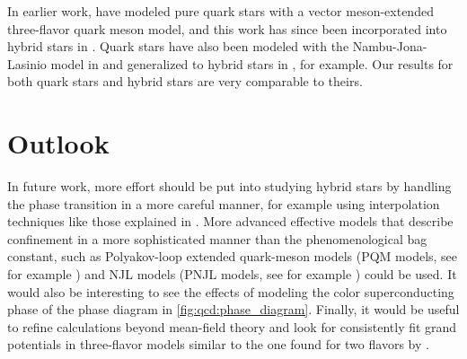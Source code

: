 In earlier work, \cite{ref:lsm3f_compact_stars} have modeled pure quark stars with a vector meson-extended three-flavor quark meson model,
and this work has since been incorporated into hybrid stars in \cite{ref:lsm3f_hybrid_stars}.
Quark stars have also been modeled with the Nambu-Jona-Lasinio model in \cite{ref:quark_star_njl} and generalized to hybrid stars in \cite{ref:hybrid_stars_njl}, for example.
Our results for both quark stars and hybrid stars are very comparable to theirs.


\section{Outlook}

In future work,
more effort should be put into studying hybrid stars by handling the phase transition in a more careful manner,
for example using interpolation techniques like those explained in \cite{ref:quark_star_review}.
More advanced effective models that describe confinement in a more sophisticated manner than the phenomenological bag constant,
such as Polyakov-loop extended quark-meson models (PQM models, see for example \cite{ref:pqm_2f,ref:pqm_3f,ref:master_folkestad}) and NJL models (PNJL models, see for example \cite{ref:pnjl_2f,ref:pnjl_3f,ref:pnjl_3f_zeroT}) could be used.
It would also be interesting to see the effects of modeling the color superconducting phase of the phase diagram in \cref{fig:qcd:phase_diagram}.
Finally, it would be useful to refine calculations beyond mean-field theory and
look for consistently fit grand potentials in three-flavor models similar to the one found for two flavors by \cite{ref:jo_lsm_consistent_chiral,ref:jo_lsm_consistent_physical}.

